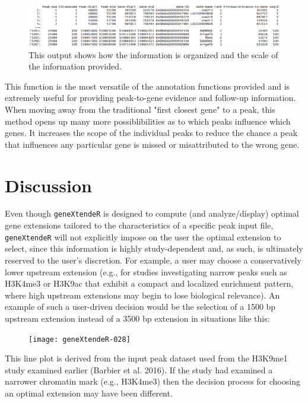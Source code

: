 \documentclass[12pt]{article}
\begin{document}
{\begin{figure}[H]
\centering
\includegraphics{figures/vignette_annotate_3500_3.png}
\caption{This output shows how the information is organized and the scale of the information provided.}
\end{figure}

This function is the most versatile of the annotation functions provided and is extremely useful for providing peak-to-gene evidence and follow-up information. When moving away from the traditional "first closest gene" to a peak, this method opens up many more possiblibilities as to which peaks influence which genes. It increases the scope of the individual peaks to reduce the chance a peak that influences any particular gene is missed or misattributed to the wrong gene.

\section*{Discussion}

Even though \texttt{geneXtendeR} is designed to compute (and analyze/display) optimal gene extensions tailored to the characteristics of a specific peak input file, \texttt{geneXtendeR} will not explicitly impose on the user the optimal extension to select, since this information is highly study-dependent and, as such, is ultimately reserved to the user's discretion.  For example, a user may choose a conservatively lower upstream extension (e.g., for studies investigating narrow peaks such as H3K4me3 or H3K9ac that exhibit a compact and localized enrichment pattern, where high upstream extensions may begin to lose biological relevance).  An example of such a user-driven decision would be the selection of a 1500 bp upstream extension instead of a 3500 bp extension in situations like this:

\begin{figure}[H]
\begin{center}
\texttt{[image: geneXtendeR-028]}
\end{center}
\end{figure}

This line plot is derived from the input peak dataset used from the H3K9me1 study examined earlier (Barbier et al. 2016).  If the study had examined a narrower chromatin mark (e.g., H3K4me3) then the decision process for choosing an optimal extension may have been different.  

}
\end{document}
